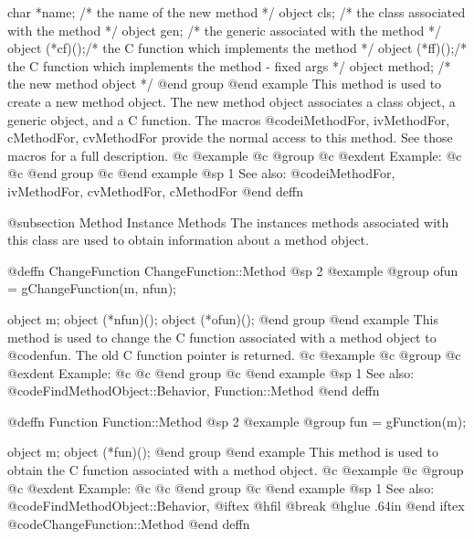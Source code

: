 char    *name;  /*  the name of the new method   */
object  cls;    /*  the class associated with the method  */
object  gen;    /*  the generic associated with the method  */
object  (*cf)();/*  the C function which implements 
                              the method  */
object  (*ff)();/*  the C function which implements 
                              the method - fixed args  */
object  method; /*  the new method object  */
@end group
@end example
This method is used to create a new method object.  The new method
object associates a class object, a generic object, and a C function.
The macros @code{iMethodFor, ivMethodFor, cMethodFor, cvMethodFor}
provide the normal access to this method.  See those macros for a
full description.
@c @example
@c @group
@c @exdent Example:
@c 
@c @end group
@c @end example
@sp 1
See also:  @code{iMethodFor, ivMethodFor, cvMethodFor, cMethodFor}
@end deffn






@subsection Method Instance Methods
The instances methods associated with this class are used to obtain
information about a method object.





@deffn {ChangeFunction} ChangeFunction::Method
@sp 2
@example
@group
ofun = gChangeFunction(m, nfun);

object  m;
object  (*nfun)();
object  (*ofun)();
@end group
@end example
This method is used to change the C function associated with a method
object to @code{nfun}.  The old C function pointer is returned.
@c @example
@c @group
@c @exdent Example:
@c 
@c @end group
@c @end example
@sp 1
See also:  @code{FindMethodObject::Behavior, Function::Method}
@end deffn










@deffn {Function} Function::Method
@sp 2
@example
@group
fun = gFunction(m);

object  m;
object  (*fun)();
@end group
@end example
This method is used to obtain the C function associated with a method
object.
@c @example
@c @group
@c @exdent Example:
@c 
@c @end group
@c @end example
@sp 1
See also:  @code{FindMethodObject::Behavior,}
@iftex
@hfil @break @hglue .64in      
@end iftex
@code{ChangeFunction::Method}
@end deffn







